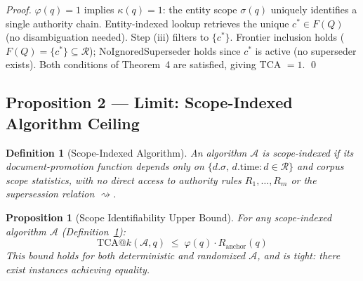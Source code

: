 \documentclass[11pt]{article}
\newtheorem{definition}{Definition}
\newtheorem{proposition}{Proposition}
\begin{document}
\begin{proof}
$\varphi(q) = 1$ implies $\kappa(q) = 1$: the entity scope $\sigma(q)$ uniquely identifies a single authority chain. Entity-indexed lookup retrieves the unique $c^* \in F(Q)$ (no disambiguation needed). Step (iii) filters to $\{c^*\}$. Frontier inclusion holds ($F(Q) = \{c^*\} \subseteq \mathcal{R}$); NoIgnoredSuperseder holds since $c^*$ is active (no superseder exists). Both conditions of Theorem~4 are satisfied, giving TCA $= 1$. \qed
\end{proof}

\subsection{Proposition 2 — Limit: Scope-Indexed Algorithm Ceiling}

\setcounter{proposition}{1}
\begin{definition}[Scope-Indexed Algorithm]
\label{def:scopeidx}
An algorithm $\mathcal{A}$ is \emph{scope-indexed} if its document-promotion function depends only on $\{d.\sigma,\, d.\mathrm{time} : d \in \mathcal{R}\}$ and corpus scope statistics, with no direct access to authority rules $R_1,\ldots,R_m$ or the supersession relation $\rightsquigarrow$.
\end{definition}

\begin{proposition}[Scope Identifiability Upper Bound]
\label{prop:phi_bound}
For any scope-indexed algorithm $\mathcal{A}$ (Definition~\ref{def:scopeidx}):
\[
  \mathrm{TCA@}k(\mathcal{A},q) \;\leq\; \varphi(q) \cdot R_{\mathrm{anchor}}(q)
\]
This bound holds for both deterministic and randomized $\mathcal{A}$, and is tight: there exist instances achieving equality.
\end{proposition}
\end{document}
